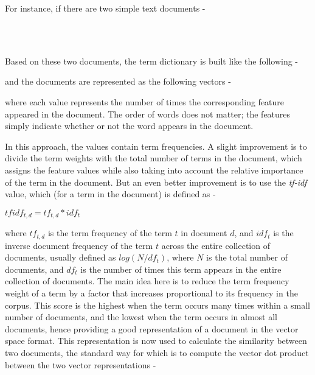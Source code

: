 For instance, if there are two simple text documents -

\begin{center}
    \\
    \\
\end{center}

Based on these two documents, the term dictionary is built like the following -


and the documents are represented as the following vectors -


where each value represents the number of times the corresponding feature appeared in the document. The order of words does not matter; the features simply indicate whether or not the word appears in the document.

In this approach, the values contain term frequencies. A slight improvement is to divide the term weights with the total number of terms in the document, which assigns the feature values while also taking into account the relative importance of the term in the document. But an even better improvement is to use the \emph{tf-idf} value, which (for a term in the document) is defined as -

\begin{center}
    \emph{$tfidf_{t, d} = tf_{t, d} * idf_{t}$}
\end{center}

where $tf_{t, d}$ is the term frequency of the term $t$ in document $d$, and $idf_{t}$ is the inverse document frequency of the term $t$ across the entire collection of documents, usually defined as $log(N / df_{t})$, where $N$ is the total number of documents, and $df_{t}$ is the number of times this term appears in the entire collection of documents. The main idea here is to reduce the term frequency weight of a term by a factor that increases proportional to its frequency in the corpus. This score is the highest when the term occurs many times within a small number of documents, and the lowest when the term occurs in almost all documents, hence providing a good representation of a document in the vector space format. This representation is now used to calculate the similarity between two documents, the standard way for which is to compute the vector dot product between the two vector representations -

